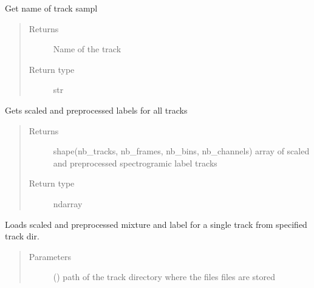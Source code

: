 \documentclass[letterpaper,10pt,english,openany,oneside]{sphinxmanual}
\begin{document}
\begin{fulllineitems}
\begin{fulllineitems}
\end{fulllineitems}


\begin{fulllineitems}
\label{\detokenize{docs/source/dataset:dataset.Dataset.get_track_name}}
Get name of track sampl
\begin{quote}\begin{description}
\item[{Returns}] \leavevmode
Name of the track

\item[{Return type}] \leavevmode
str

\end{description}\end{quote}

\end{fulllineitems}


\begin{fulllineitems}
\label{\detokenize{docs/source/dataset:dataset.Dataset.labels}}
Gets scaled and preprocessed labels for all tracks
\begin{quote}\begin{description}
\item[{Returns}] \leavevmode
{} \textendash{} shape(nb\_tracks, nb\_frames, nb\_bins, nb\_channels)
array of scaled and preprocessed spectrogramic label tracks

\item[{Return type}] \leavevmode
ndarray

\end{description}\end{quote}

\end{fulllineitems}


\begin{fulllineitems}
\label{\detokenize{docs/source/dataset:dataset.Dataset.load}}
Loads scaled and preprocessed mixture and label for a single track from specified track dir.
\begin{quote}\begin{description}
\item[{Parameters}] \leavevmode
{} () \textendash{} path of the track directory where the files files are stored


\end{description}
\end{quote}
\end{fulllineitems}
\end{fulllineitems}
\end{document}
